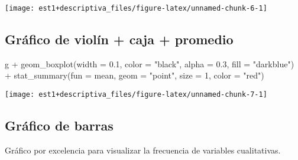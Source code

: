 \documentclass[
]{book}
\newenvironment{Shaded}{\begin{snugshade}}{\end{snugshade}}
\newcommand{\AttributeTok}[1]{\textcolor[rgb]{0.77,0.63,0.00}{#1}}
\newcommand{\DecValTok}[1]{\textcolor[rgb]{0.00,0.00,0.81}{#1}}
\newcommand{\FloatTok}[1]{\textcolor[rgb]{0.00,0.00,0.81}{#1}}
\newcommand{\FunctionTok}[1]{\textcolor[rgb]{0.00,0.00,0.00}{#1}}
\newcommand{\NormalTok}[1]{#1}
\newcommand{\OtherTok}[1]{\textcolor[rgb]{0.56,0.35,0.01}{#1}}
\newcommand{\SpecialCharTok}[1]{\textcolor[rgb]{0.00,0.00,0.00}{#1}}
\newcommand{\StringTok}[1]{\textcolor[rgb]{0.31,0.60,0.02}{#1}}
\theoremstyle{definition}
\theoremstyle{definition}
\theoremstyle{definition}
\theoremstyle{definition}
\theoremstyle{remark}
\begin{document}
\begin{center}\texttt{[image: est1+descriptiva\_files/figure-latex/unnamed-chunk-6-1]} \end{center}

\hypertarget{gruxe1fico-de-violuxedn-caja-promedio}{%
\subsection*{Gráfico de violín + caja + promedio}\label{gruxe1fico-de-violuxedn-caja-promedio}}

\begin{Shaded}
\begin{Highlighting}[]
\NormalTok{g }\SpecialCharTok{+} \FunctionTok{geom\_boxplot}\NormalTok{(}\AttributeTok{width =} \FloatTok{0.1}\NormalTok{, }\AttributeTok{color =} \StringTok{"black"}\NormalTok{,}
                 \AttributeTok{alpha =} \FloatTok{0.3}\NormalTok{, }\AttributeTok{fill =} \StringTok{"darkblue"}\NormalTok{)  }\SpecialCharTok{+}
  \FunctionTok{stat\_summary}\NormalTok{(}\AttributeTok{fun =}\NormalTok{ mean, }\AttributeTok{geom =} \StringTok{"point"}\NormalTok{,}
               \AttributeTok{size =} \DecValTok{1}\NormalTok{, }\AttributeTok{color =} \StringTok{"red"}\NormalTok{)}
\end{Highlighting}
\end{Shaded}

\begin{center}\texttt{[image: est1+descriptiva\_files/figure-latex/unnamed-chunk-7-1]} \end{center}

\hypertarget{gruxe1fico-de-barras}{%
\subsection*{Gráfico de barras}\label{gruxe1fico-de-barras}}

Gráfico por excelencia para visualizar la frecuencia de variables cualitativas.

\begin{Shaded}
\end{Shaded}
\end{document}
